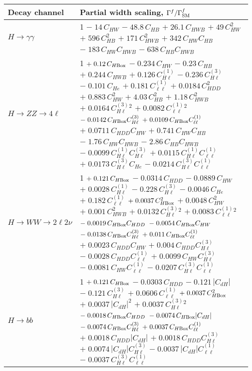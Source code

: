 \begin{tabular}{l|p{}}
    \hline
    Decay channel & Partial width scaling, $\Gamma^f/\Gamma^f_{\rm{SM}}$ \\ \hline
    $H \rightarrow \gamma\gamma$ & 1 $-\;14\,C_{HW}$ $-\;48.8\,C_{HB}$ $+\;26.1\,C_{HWB}$ $+\;49\,C_{HW}^{2}$ $+\;596\,C_{HB}^{2}$ $+\;171\,C_{HWB}^{2}$ $+\;342\,C_{HW}C_{HB}$ $-\;183\,C_{HW}C_{HWB}$ $-\;638\,C_{HB}C_{HWB}$ \\
    $H \rightarrow ZZ \rightarrow 4\ell$ & 1 $+\;0.12\,C_{H\rm{Box}}$ $-\;0.234\,C_{HW}$ $-\;0.23\,C_{HB}$ $+\;0.244\,C_{HWB}$ $+\;0.126\,C^{(1)}_{H\ell}$ $-\;0.236\,C^{(3)}_{H\ell}$ $-\;0.101\,C_{He}$ $+\;0.181\,C^{(1)}_{\ell\ell}$ $+\;0.0184\,C_{HDD}^{2}$ $+\;0.883\,C_{HW}^{2}$ $+\;4.03\,C_{HB}^{2}$ $+\;1.18\,C_{HWB}^{2}$ $+\;0.0164\,C^{(3)}_{H\ell}^{2}$ $+\;0.0082\,C^{(1)}_{\ell\ell}^{2}$ $-\;0.0142\,C_{H\rm{Box}}C^{(3)}_{H\ell}$ $+\;0.0109\,C_{H\rm{Box}}C^{(1)}_{\ell\ell}$ $+\;0.0711\,C_{HDD}C_{HW}$ $+\;0.741\,C_{HW}C_{HB}$ $-\;1.76\,C_{HW}C_{HWB}$ $-\;2.86\,C_{HB}C_{HWB}$ $-\;0.0099\,C^{(1)}_{H\ell}C^{(3)}_{H\ell}$ $+\;0.0115\,C^{(1)}_{H\ell}C^{(1)}_{\ell\ell}$ $+\;0.0173\,C^{(3)}_{H\ell}C_{He}$ $-\;0.0214\,C^{(3)}_{H\ell}C^{(1)}_{\ell\ell}$ \\
    $H \rightarrow WW \rightarrow 2\ell2\nu$ & 1 $+\;0.121\,C_{H\rm{Box}}$ $-\;0.0314\,C_{HDD}$ $-\;0.0889\,C_{HW}$ $+\;0.0028\,C^{(1)}_{H\ell}$ $-\;0.228\,C^{(3)}_{H\ell}$ $-\;0.0046\,C_{He}$ $+\;0.182\,C^{(1)}_{\ell\ell}$ $+\;0.0037\,C_{H\rm{Box}}^{2}$ $+\;0.0048\,C_{HW}^{2}$ $+\;0.001\,C_{HWB}^{2}$ $+\;0.0132\,C^{(3)}_{H\ell}^{2}$ $+\;0.0083\,C^{(1)}_{\ell\ell}^{2}$ $-\;0.0019\,C_{H\rm{Box}}C_{HDD}$ $-\;0.0054\,C_{H\rm{Box}}C_{HW}$ $-\;0.0138\,C_{H\rm{Box}}C^{(3)}_{H\ell}$ $+\;0.011\,C_{H\rm{Box}}C^{(1)}_{\ell\ell}$ $+\;0.0023\,C_{HDD}C_{HW}$ $+\;0.004\,C_{HDD}C^{(3)}_{H\ell}$ $-\;0.0028\,C_{HDD}C^{(1)}_{\ell\ell}$ $+\;0.0099\,C_{HW}C^{(3)}_{H\ell}$ $-\;0.0081\,C_{HW}C^{(1)}_{\ell\ell}$ $-\;0.0207\,C^{(3)}_{H\ell}C^{(1)}_{\ell\ell}$ \\
    $H \rightarrow bb$ & 1 $+\;0.121\,C_{H\rm{Box}}$ $-\;0.0303\,C_{HDD}$ $-\;0.121\,|C_{dH}|$ $-\;0.121\,C^{(3)}_{H\ell}$ $+\;0.0606\,C^{(1)}_{\ell\ell}$ $+\;0.0037\,C_{H\rm{Box}}^{2}$ $+\;0.0037\,|C_{dH}|^{2}$ $+\;0.0037\,C^{(3)}_{H\ell}^{2}$ $-\;0.0018\,C_{H\rm{Box}}C_{HDD}$ $-\;0.0074\,C_{H\rm{Box}}|C_{dH}|$ $-\;0.0074\,C_{H\rm{Box}}C^{(3)}_{H\ell}$ $+\;0.0037\,C_{H\rm{Box}}C^{(1)}_{\ell\ell}$ $+\;0.0018\,C_{HDD}|C_{dH}|$ $+\;0.0018\,C_{HDD}C^{(3)}_{H\ell}$ $+\;0.0074\,|C_{dH}|C^{(3)}_{H\ell}$ $-\;0.0037\,|C_{dH}|C^{(1)}_{\ell\ell}$ $-\;0.0037\,C^{(3)}_{H\ell}C^{(1)}_{\ell\ell}$ \\

\end{tabular}
